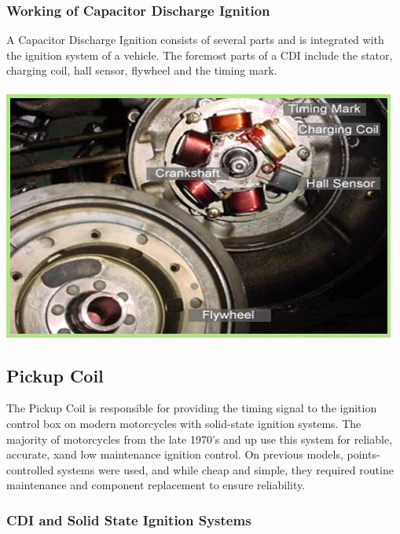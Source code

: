 \documentclass[a4paper]{article}
\begin{document}
\subsubsection{Working of Capacitor Discharge Ignition}
A Capacitor Discharge Ignition consists of several parts and is integrated with the ignition system of
a vehicle. The foremost parts of a CDI include the stator, charging coil, hall sensor, flywheel and the timing mark. \\ \\
\includegraphics[scale=0.6]{SETUP_CDI}

\subsection{Pickup Coil}
The Pickup Coil is responsible for providing the timing signal to the ignition control box on modern motorcycles
with solid-state ignition systems. The majority of motorcycles from the late 1970's and up use this system for reliable, accurate,
xand low maintenance ignition control. On previous models, points-controlled systems were used, and while cheap and simple, they required 
routine maintenance and component replacement to ensure reliability.
\subsubsection{CDI and Solid State Ignition Systems}
\end{document}
